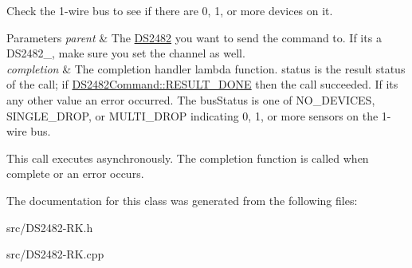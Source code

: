 Check the 1-\/wire bus to see if there are 0, 1, or more devices on it. 


\begin{DoxyParams}{Parameters}
{\em parent} & The \mbox{\hyperlink{class_d_s2482}{D\+S2482}} you want to send the command to. If it\textquotesingle{}s a D\+S2482\+\_, make sure you set the channel as well.\\
\hline
{\em completion} & The completion handler lambda function. status is the result status of the call; if \mbox{\hyperlink{class_d_s2482_command_a8ffcf84807c97928dbfc61d75788e32b}{D\+S2482\+Command\+::\+R\+E\+S\+U\+L\+T\+\_\+\+D\+O\+NE}} then the call succeeded. If it\textquotesingle{}s any other value an error occurred. The bus\+Status is one of N\+O\+\_\+\+D\+E\+V\+I\+C\+ES, S\+I\+N\+G\+L\+E\+\_\+\+D\+R\+OP, or M\+U\+L\+T\+I\+\_\+\+D\+R\+OP indicating 0, 1, or more sensors on the 1-\/wire bus.\\
\hline
\end{DoxyParams}
This call executes asynchronously. The completion function is called when complete or an error occurs. 

The documentation for this class was generated from the following files\+:\begin{DoxyCompactItemize}
\item 
src/D\+S2482-\/\+R\+K.\+h\item 
src/D\+S2482-\/\+R\+K.\+cpp\end{DoxyCompactItemize}
